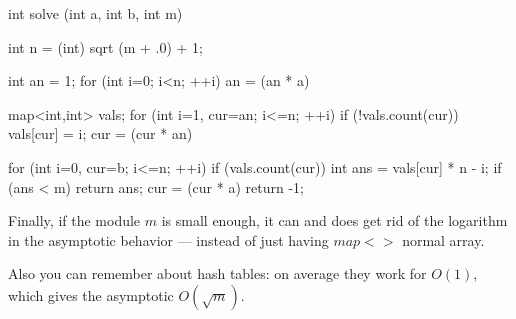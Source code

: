 \code
int solve (int a, int b, int m) {
int n = (int) sqrt (m + .0) + 1;

int an = 1;
for (int i=0; i<n; ++i)
an = (an * a) %

map<int,int> vals;
for (int i=1, cur=an; i<=n; ++i) {
if (!vals.count(cur))
vals[cur] = i;
cur = (cur * an) %
}

for (int i=0, cur=b; i<=n; ++i) {
if (vals.count(cur)) {
int ans = vals[cur] * n - i;
if (ans < m)
return ans;
}
cur = (cur * a) %
}
return -1;
}
\endcode

Finally, if the module $m$ is small enough, it can and does get rid of the logarithm in the asymptotic behavior --- instead of just having $map<>$ normal array.

Also you can remember about hash tables: on average they work for $O(1)$, which gives the asymptotic $O (\sqrt{m})$.